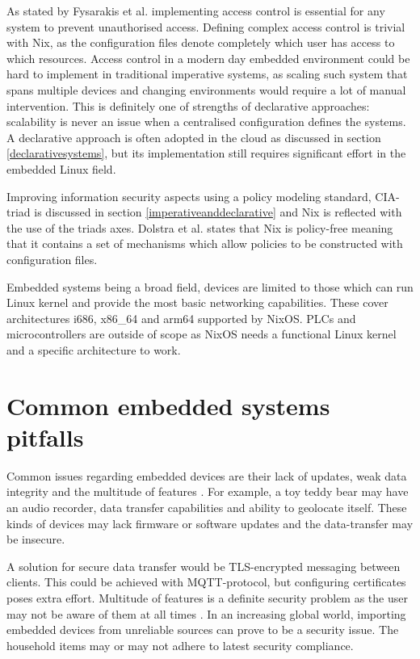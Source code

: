 As stated by Fysarakis et al. \cite{fysarakis2014embedded} implementing access control is essential
for any system to prevent unauthorised access. Defining complex access control is
trivial with Nix, as the configuration files denote completely which
user has access to which resources. Access control in a modern day
embedded environment could be hard to implement in traditional
imperative systems, as scaling such system that spans multiple devices
and changing environments would require a lot of manual
intervention. This is definitely one of strengths of declarative
approaches: scalability is never an issue when a centralised
configuration defines the systems. A declarative approach is often
adopted in the cloud as discussed in section \ref{declarativesystems}, but its implementation still
requires significant effort in the embedded Linux field.

Improving information security aspects using a policy
modeling standard, CIA-triad is discussed in section
\ref{imperativeanddeclarative} and Nix is reflected with the use of
the triads axes. Dolstra et al. \cite{dolstra2004nix} states that Nix is policy-free meaning that
it contains a set of mechanisms which allow policies to be constructed
with configuration files.

Embedded systems being a broad field,  devices are limited to
those which can run Linux kernel and provide the most basic networking
capabilities. These cover architectures i686, x86\_64 and arm64 supported
by NixOS. PLCs and microcontrollers are outside of scope as NixOS
needs a functional Linux kernel and a specific architecture to work.

\section{Common embedded systems pitfalls}

Common issues regarding embedded devices are their lack of updates,
weak data integrity and the multitude of features
\cite{kemmerer2003cybersecurity, fysarakis2014embedded}. For example,
a toy teddy bear may have an audio recorder, data transfer capabilities
and ability to geolocate itself. These kinds of devices may lack
firmware or software updates and the data-transfer may be insecure.

A solution for secure data transfer would be TLS-encrypted messaging
between clients. This could be achieved with MQTT-protocol, but
configuring certificates poses extra effort. Multitude of features is a
definite security problem as the user may not be aware of them at all
times \cite{fysarakis2014embedded}. In an increasing global world, importing embedded devices from
unreliable sources can prove to be a security issue. The household
items may or may not adhere to latest security
compliance. 

